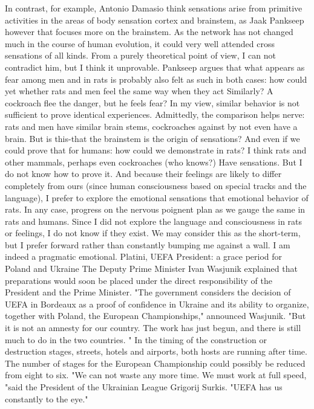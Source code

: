 In contrast, for example, Antonio Damasio think sensations arise from primitive activities in the areas of body sensation cortex and brainstem, as Jaak Pankseep however that focuses more on the brainstem.
As the network has not changed much in the course of human evolution, it could very well attended cross sensations of all kinds.
From a purely theoretical point of view, I can not contradict him, but I think it unprovable.
Pankseep argues that what appears as fear among men and in rats is probably also felt as such in both cases: how could yet whether rats and men feel the same way when they act Similarly?
A cockroach flee the danger, but he feels fear?
In my view, similar behavior is not sufficient to prove identical experiences.
Admittedly, the comparison helps nerve: rats and men have similar brain stems, cockroaches against by not even have a brain.
But is this-that the brainstem is the origin of sensations?
And even if we could prove that for humans: how could we demonstrate in rats?
I think rats and other mammals, perhaps even cockroaches (who knows?) Have sensations.
But I do not know how to prove it.
And because their feelings are likely to differ completely from ours (since human consciousness based on special tracks and the language), I prefer to explore the emotional sensations that emotional behavior of rats.
In any case, progress on the nervous poignent plan as we gauge the same in rats and humans.
Since I did not explore the language and consciousness in rats or feelings, I do not know if they exist.
We may consider this as the short-term, but I prefer forward rather than constantly bumping me against a wall.
I am indeed a pragmatic emotional.
Platini, UEFA President: a grace period for Poland and Ukraine
The Deputy Prime Minister Ivan Wasjunik explained that preparations would soon be placed under the direct responsibility of the President and the Prime Minister.
"The government considers the decision of UEFA in Bordeaux as a proof of confidence in Ukraine and its ability to organize, together with Poland, the European Championships," announced Wasjunik.
"But it is not an amnesty for our country.
The work has just begun, and there is still much to do in the two countries. "
In the timing of the construction or destruction stages, streets, hotels and airports, both hosts are running after time.
The number of stages for the European Championship could possibly be reduced from eight to six.
"We can not waste any more time.
We must work at full speed, "said the President of the Ukrainian League Grigorij Surkis.
"UEFA has us constantly to the eye."
